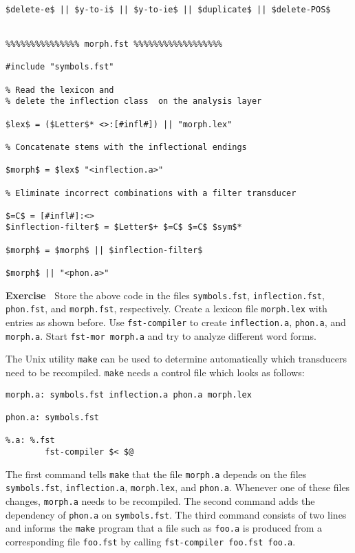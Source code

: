 \documentclass[11pt]{article}
\newenvironment{exercise}{

  \hrulefill\nopagebreak

  \textbf{Exercise~}}
{

  \nopagebreak\hrulefill\vspace{0.2cm}

}
\begin{document}
\begin{verbatim}
$delete-e$ || $y-to-i$ || $y-to-ie$ || $duplicate$ || $delete-POS$


%%%%%%%%%%%%%%% morph.fst %%%%%%%%%%%%%%%%%%

#include "symbols.fst"

% Read the lexicon and
% delete the inflection class  on the analysis layer

$lex$ = ($Letter$* <>:[#infl#]) || "morph.lex"

% Concatenate stems with the inflectional endings

$morph$ = $lex$ "<inflection.a>"

% Eliminate incorrect combinations with a filter transducer

$=C$ = [#infl#]:<>
$inflection-filter$ = $Letter$+ $=C$ $=C$ $sym$*

$morph$ = $morph$ || $inflection-filter$

$morph$ || "<phon.a>"
\end{verbatim}


\begin{exercise}
  Store the above code in the files \texttt{symbols.fst},
  \texttt{inflection.fst}, \texttt{phon.fst}, and \texttt{morph.fst},
  respectively. Create a lexicon file \texttt{morph.lex} with entries
  as shown before. Use \texttt{fst-compiler} to create
  \texttt{inflection.a}, \texttt{phon.a}, and \texttt{morph.a}. Start
  \texttt{fst-mor morph.a} and try to analyze different word forms.
\end{exercise}

The Unix utility \texttt{make} can be used to determine automatically
which transducers need to be recompiled. \texttt{make} needs a control
file which looks as follows:

\begin{verbatim}
morph.a: symbols.fst inflection.a phon.a morph.lex

phon.a: symbols.fst

%.a: %.fst
        fst-compiler $< $@
\end{verbatim}

The first command tells \texttt{make} that the file \texttt{morph.a}
depends on the files \texttt{symbols.fst}, \texttt{inflection.a},
\texttt{morph.lex}, and \texttt{phon.a}. Whenever one of these files
changes, \texttt{morph.a} needs to be recompiled. The second command
adds the dependency of \texttt{phon.a} on \texttt{symbols.fst}. The
third command consists of two lines and informs the \texttt{make}
program that a file such as \texttt{foo.a} is produced from a
corresponding file \texttt{foo.fst} by calling \texttt{fst-compiler
  foo.fst foo.a}. 
\end{document}
